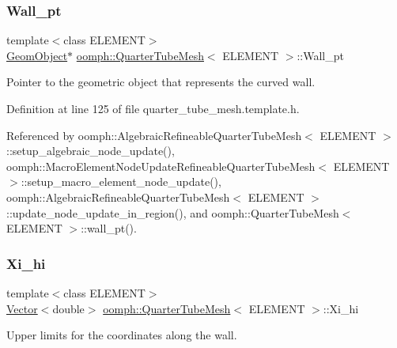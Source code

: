 \subsubsection{\texorpdfstring{Wall\+\_\+pt}{Wall\_pt}}
{\footnotesize\ttfamily template$<$class E\+L\+E\+M\+E\+NT$>$ \\
\hyperlink{classoomph_1_1GeomObject}{Geom\+Object}$\ast$ \hyperlink{classoomph_1_1QuarterTubeMesh}{oomph\+::\+Quarter\+Tube\+Mesh}$<$ E\+L\+E\+M\+E\+NT $>$\+::Wall\+\_\+pt\hspace{0.3cm}{\ttfamily [protected]}}



Pointer to the geometric object that represents the curved wall. 



Definition at line 125 of file quarter\+\_\+tube\+\_\+mesh.\+template.\+h.



Referenced by oomph\+::\+Algebraic\+Refineable\+Quarter\+Tube\+Mesh$<$ E\+L\+E\+M\+E\+N\+T $>$\+::setup\+\_\+algebraic\+\_\+node\+\_\+update(), oomph\+::\+Macro\+Element\+Node\+Update\+Refineable\+Quarter\+Tube\+Mesh$<$ E\+L\+E\+M\+E\+N\+T $>$\+::setup\+\_\+macro\+\_\+element\+\_\+node\+\_\+update(), oomph\+::\+Algebraic\+Refineable\+Quarter\+Tube\+Mesh$<$ E\+L\+E\+M\+E\+N\+T $>$\+::update\+\_\+node\+\_\+update\+\_\+in\+\_\+region(), and oomph\+::\+Quarter\+Tube\+Mesh$<$ E\+L\+E\+M\+E\+N\+T $>$\+::wall\+\_\+pt().

\mbox{\label{classoomph_1_1QuarterTubeMesh_aabb226a0b0208c579f426e58d944685c}} 
\subsubsection{\texorpdfstring{Xi\+\_\+hi}{Xi\_hi}}
{\footnotesize\ttfamily template$<$class E\+L\+E\+M\+E\+NT$>$ \\
\hyperlink{classoomph_1_1Vector}{Vector}$<$double$>$ \hyperlink{classoomph_1_1QuarterTubeMesh}{oomph\+::\+Quarter\+Tube\+Mesh}$<$ E\+L\+E\+M\+E\+NT $>$\+::Xi\+\_\+hi\hspace{0.3cm}{\ttfamily [protected]}}



Upper limits for the coordinates along the wall. 



